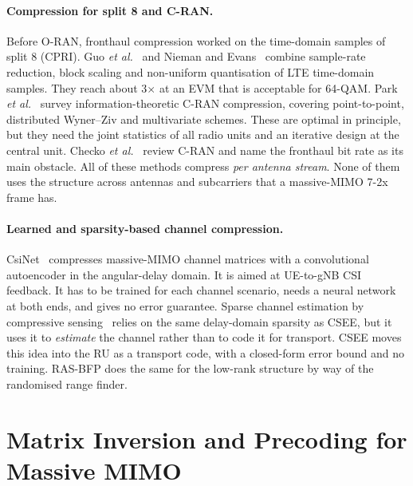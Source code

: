 \paragraph{Compression for split 8 and C-RAN.} Before O-RAN, fronthaul compression worked on the time-domain samples of split 8 (CPRI). Guo \emph{et al.}~\cite{guo2013} and Nieman and Evans~\cite{nieman2013} combine sample-rate reduction, block scaling and non-uniform quantisation of LTE time-domain samples. They reach about 3$\times$ at an EVM that is acceptable for 64-QAM. Park \emph{et al.}~\cite{park2014} survey information-theoretic C-RAN compression, covering point-to-point, distributed Wyner--Ziv and multivariate schemes. These are optimal in principle, but they need the joint statistics of all radio units and an iterative design at the central unit. Checko \emph{et al.}~\cite{checko2015} review C-RAN and name the fronthaul bit rate as its main obstacle. All of these methods compress \emph{per antenna stream}. None of them uses the structure across antennas and subcarriers that a massive-MIMO 7-2x frame has.

\paragraph{Learned and sparsity-based channel compression.} CsiNet~\cite{wen2018} compresses massive-MIMO channel matrices with a convolutional autoencoder in the angular-delay domain. It is aimed at UE-to-gNB CSI feedback. It has to be trained for each channel scenario, needs a neural network at both ends, and gives no error guarantee. Sparse channel estimation by compressive sensing~\cite{berger2010} relies on the same delay-domain sparsity as CSEE, but it uses it to \emph{estimate} the channel rather than to code it for transport. CSEE moves this idea into the RU as a transport code, with a closed-form error bound and no training. RAS-BFP does the same for the low-rank structure by way of the randomised range finder.

\section{Matrix Inversion and Precoding for Massive MIMO}
\label{sec:lit-inv}

